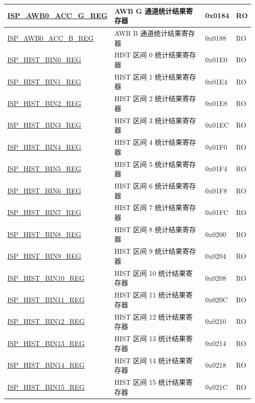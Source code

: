 \begin{longtable}{ | p{6cm} | p{7.2cm} | p{1.3cm} | p{1cm} | }
\hyperref[regdesc:ISPAWB0ACCGREG]{ISP\_AWB0\_ACC\_G\_REG} & AWB G 通道统计结果寄存器 & 0x0184 & RO \\ \hline
\hyperref[regdesc:ISPAWB0ACCBREG]{ISP\_AWB0\_ACC\_B\_REG} & AWB B 通道统计结果寄存器 & 0x0188 & RO \\ \hline
\hyperref[regdesc:ISPHISTBIN0REG]{ISP\_HIST\_BIN0\_REG} & HIST 区间 0 统计结果寄存器 & 0x01E0 & RO \\ \hline
\hyperref[regdesc:ISPHISTBIN1REG]{ISP\_HIST\_BIN1\_REG} & HIST 区间 1 统计结果寄存器 & 0x01E4 & RO \\ \hline
\hyperref[regdesc:ISPHISTBIN2REG]{ISP\_HIST\_BIN2\_REG} & HIST 区间 2 统计结果寄存器 & 0x01E8 & RO \\ \hline
\hyperref[regdesc:ISPHISTBIN3REG]{ISP\_HIST\_BIN3\_REG} & HIST 区间 3 统计结果寄存器 & 0x01EC & RO \\ \hline
\hyperref[regdesc:ISPHISTBIN4REG]{ISP\_HIST\_BIN4\_REG} & HIST 区间 4 统计结果寄存器 & 0x01F0 & RO \\ \hline
\hyperref[regdesc:ISPHISTBIN5REG]{ISP\_HIST\_BIN5\_REG} & HIST 区间 5 统计结果寄存器 & 0x01F4 & RO \\ \hline
\hyperref[regdesc:ISPHISTBIN6REG]{ISP\_HIST\_BIN6\_REG} & HIST 区间 6 统计结果寄存器 & 0x01F8 & RO \\ \hline
\hyperref[regdesc:ISPHISTBIN7REG]{ISP\_HIST\_BIN7\_REG} & HIST 区间 7 统计结果寄存器 & 0x01FC & RO \\ \hline
\hyperref[regdesc:ISPHISTBIN8REG]{ISP\_HIST\_BIN8\_REG} & HIST 区间 8 统计结果寄存器 & 0x0200 & RO \\ \hline
\hyperref[regdesc:ISPHISTBIN9REG]{ISP\_HIST\_BIN9\_REG} & HIST 区间 9 统计结果寄存器 & 0x0204 & RO \\ \hline
\hyperref[regdesc:ISPHISTBIN10REG]{ISP\_HIST\_BIN10\_REG} & HIST 区间 10 统计结果寄存器 & 0x0208 & RO \\ \hline
\hyperref[regdesc:ISPHISTBIN11REG]{ISP\_HIST\_BIN11\_REG} & HIST 区间 11 统计结果寄存器 & 0x020C & RO \\ \hline
\hyperref[regdesc:ISPHISTBIN12REG]{ISP\_HIST\_BIN12\_REG} & HIST 区间 12 统计结果寄存器 & 0x0210 & RO \\ \hline
\hyperref[regdesc:ISPHISTBIN13REG]{ISP\_HIST\_BIN13\_REG} & HIST 区间 13 统计结果寄存器 & 0x0214 & RO \\ \hline
\hyperref[regdesc:ISPHISTBIN14REG]{ISP\_HIST\_BIN14\_REG} & HIST 区间 14 统计结果寄存器 & 0x0218 & RO \\ \hline
\hyperref[regdesc:ISPHISTBIN15REG]{ISP\_HIST\_BIN15\_REG} & HIST 区间 15 统计结果寄存器 & 0x021C & RO \\ \hline

\end{longtable}
